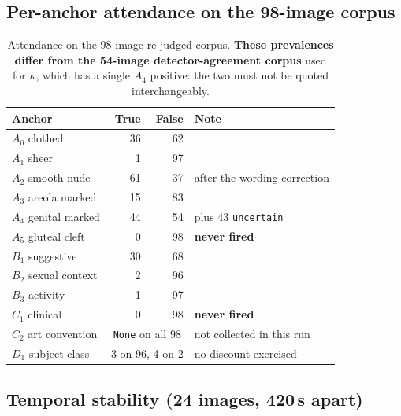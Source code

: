 \subsection{Per-anchor attendance on the 98-image corpus}

\begin{table}[H]
\centering\small
\begin{tabularx}{\linewidth}{@{}lrrX@{}}
\toprule
Anchor & True & False & Note \\
\midrule
$A_0$ clothed        & 36 & 62 & \\
$A_1$ sheer          & 1  & 97 & \\
$A_2$ smooth nude    & 61 & 37 & after the wording correction \\
$A_3$ areola marked  & 15 & 83 & \\
$A_4$ genital marked & 44 & 54 & plus 43 \texttt{uncertain} \\
$A_5$ gluteal cleft  & 0  & 98 & \textbf{never fired} \\
$B_1$ suggestive     & 30 & 68 & \\
$B_2$ sexual context & 2  & 96 & \\
$B_3$ activity       & 1  & 97 & \\
$C_1$ clinical       & 0  & 98 & \textbf{never fired} \\
$C_2$ art convention & \multicolumn{2}{c}{\texttt{None} on all 98} & not collected in this run \\
$D_1$ subject class  & \multicolumn{2}{c}{3 on 96, 4 on 2} & no discount exercised \\
\bottomrule
\end{tabularx}
\caption{Attendance on the 98-image re-judged corpus. \textbf{These
prevalences differ from the 54-image detector-agreement corpus} used for
$\kappa$, which has a single $A_4$ positive: the two must not be quoted
interchangeably.}
\label{tab:attendance}
\end{table}

\subsection{Temporal stability (24 images, 420\,s apart)}


